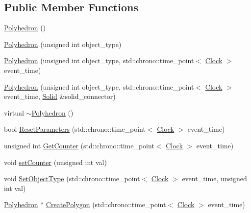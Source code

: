 \subsection*{Public Member Functions}
\begin{DoxyCompactItemize}
\item 
\mbox{\hyperlink{classPolyhedron_aebdf7ee85eb636069bf93afb4e6a483f}{Polyhedron}} ()
\item 
\mbox{\hyperlink{classPolyhedron_a304950efef7fb67203d8136578b42535}{Polyhedron}} (unsigned int object\+\_\+type)
\item 
\mbox{\hyperlink{classPolyhedron_a29a4fff595cdb6a557e5f62255e61192}{Polyhedron}} (unsigned int object\+\_\+type, std\+::chrono\+::time\+\_\+point$<$ \mbox{\hyperlink{universe_8h_a0ef8d951d1ca5ab3cfaf7ab4c7a6fd80}{Clock}} $>$ event\+\_\+time)
\item 
\mbox{\hyperlink{classPolyhedron_af5bb1d2a6b04502dfdbfc9f04aafc950}{Polyhedron}} (unsigned int object\+\_\+type, std\+::chrono\+::time\+\_\+point$<$ \mbox{\hyperlink{universe_8h_a0ef8d951d1ca5ab3cfaf7ab4c7a6fd80}{Clock}} $>$ event\+\_\+time, \mbox{\hyperlink{classSolid}{Solid}} \&solid\+\_\+connector)
\item 
virtual \mbox{\hyperlink{classPolyhedron_a3ad3df8be901a55ddcd97128ac890473}{$\sim$\+Polyhedron}} ()
\item 
bool \mbox{\hyperlink{classPolyhedron_ae90c347cfb8ca8028a260e88bef2b45c}{Reset\+Parameters}} (std\+::chrono\+::time\+\_\+point$<$ \mbox{\hyperlink{universe_8h_a0ef8d951d1ca5ab3cfaf7ab4c7a6fd80}{Clock}} $>$ event\+\_\+time)
\item 
unsigned int \mbox{\hyperlink{classPolyhedron_a021ec67f2040f8ec26df64e4b9370521}{Get\+Counter}} (std\+::chrono\+::time\+\_\+point$<$ \mbox{\hyperlink{universe_8h_a0ef8d951d1ca5ab3cfaf7ab4c7a6fd80}{Clock}} $>$ event\+\_\+time)
\item 
void \mbox{\hyperlink{classPolyhedron_ad74a1ccc28a08bc2dbc186e5f2c1f694}{set\+Counter}} (unsigned int val)
\item 
void \mbox{\hyperlink{classPolyhedron_a014c8f981aef5fa1d70dcb5be6a0875a}{Set\+Object\+Type}} (std\+::chrono\+::time\+\_\+point$<$ \mbox{\hyperlink{universe_8h_a0ef8d951d1ca5ab3cfaf7ab4c7a6fd80}{Clock}} $>$ event\+\_\+time, unsigned int val)
\item 
\mbox{\hyperlink{classPolyhedron}{Polyhedron}} $\ast$ \mbox{\hyperlink{classPolyhedron_ae5852dd26065d9f38ed293f8d95106ad}{Create\+Polygon}} (std\+::chrono\+::time\+\_\+point$<$ \mbox{\hyperlink{universe_8h_a0ef8d951d1ca5ab3cfaf7ab4c7a6fd80}{Clock}} $>$ event\+\_\+time)

\end{DoxyCompactItemize}
